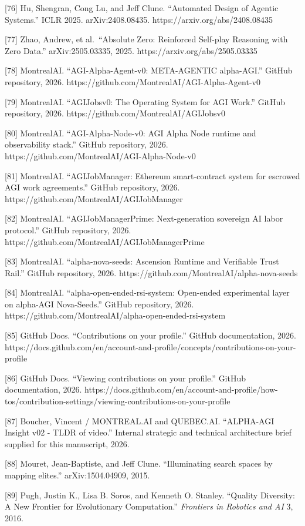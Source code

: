 \documentclass[
  11pt,
]{article}
\begin{document}
{[}76{]} Hu, Shengran, Cong Lu, and Jeff Clune. ``Automated Design of
Agentic Systems.'' ICLR 2025. arXiv:2408.08435.
https://arxiv.org/abs/2408.08435

{[}77{]} Zhao, Andrew, et al.~``Absolute Zero: Reinforced Self-play
Reasoning with Zero Data.'' arXiv:2505.03335, 2025.
https://arxiv.org/abs/2505.03335

{[}78{]} MontrealAI. ``AGI-Alpha-Agent-v0: META-AGENTIC alpha-AGI.''
GitHub repository, 2026.
https://github.com/MontrealAI/AGI-Alpha-Agent-v0

{[}79{]} MontrealAI. ``AGIJobsv0: The Operating System for AGI Work.''
GitHub repository, 2026. https://github.com/MontrealAI/AGIJobsv0

{[}80{]} MontrealAI. ``AGI-Alpha-Node-v0: AGI Alpha Node runtime and
observability stack.'' GitHub repository, 2026.
https://github.com/MontrealAI/AGI-Alpha-Node-v0

{[}81{]} MontrealAI. ``AGIJobManager: Ethereum smart-contract system for
escrowed AGI work agreements.'' GitHub repository, 2026.
https://github.com/MontrealAI/AGIJobManager

{[}82{]} MontrealAI. ``AGIJobManagerPrime: Next-generation sovereign AI
labor protocol.'' GitHub repository, 2026.
https://github.com/MontrealAI/AGIJobManagerPrime

{[}83{]} MontrealAI. ``alpha-nova-seeds: Ascension Runtime and
Verifiable Trust Rail.'' GitHub repository, 2026.
https://github.com/MontrealAI/alpha-nova-seeds

{[}84{]} MontrealAI. ``alpha-open-ended-rsi-system: Open-ended
experimental layer on alpha-AGI Nova-Seeds.'' GitHub repository, 2026.
https://github.com/MontrealAI/alpha-open-ended-rsi-system

{[}85{]} GitHub Docs. ``Contributions on your profile.'' GitHub
documentation, 2026.
https://docs.github.com/en/account-and-profile/concepts/contributions-on-your-profile

{[}86{]} GitHub Docs. ``Viewing contributions on your profile.'' GitHub
documentation, 2026.
https://docs.github.com/en/account-and-profile/how-tos/contribution-settings/viewing-contributions-on-your-profile

{[}87{]} Boucher, Vincent / MONTREAL.AI and QUEBEC.AI. ``ALPHA-AGI
Insight v02 - TLDR of video.'' Internal strategic and technical
architecture brief supplied for this manuscript, 2026.

{[}88{]} Mouret, Jean-Baptiste, and Jeff Clune. ``Illuminating search
spaces by mapping elites.'' arXiv:1504.04909, 2015.

{[}89{]} Pugh, Justin K., Lisa B. Soros, and Kenneth O. Stanley.
``Quality Diversity: A New Frontier for Evolutionary Computation.''
\emph{Frontiers in Robotics and AI} 3, 2016.
\end{document}
